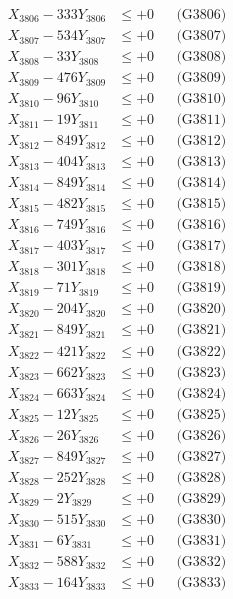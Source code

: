 \documentclass[a4paper,10pt]{article}
\begin{document}
{\begin{align}
X_{3806} - 333Y_{3806} &\leq +0 && \text{(G3806)} \\
X_{3807} - 534Y_{3807} &\leq +0 && \text{(G3807)} \\
X_{3808} - 33Y_{3808} &\leq +0 && \text{(G3808)} \\
X_{3809} - 476Y_{3809} &\leq +0 && \text{(G3809)} \\
X_{3810} - 96Y_{3810} &\leq +0 && \text{(G3810)} \\
\allowbreak
X_{3811} - 19Y_{3811} &\leq +0 && \text{(G3811)} \\
X_{3812} - 849Y_{3812} &\leq +0 && \text{(G3812)} \\
X_{3813} - 404Y_{3813} &\leq +0 && \text{(G3813)} \\
X_{3814} - 849Y_{3814} &\leq +0 && \text{(G3814)} \\
X_{3815} - 482Y_{3815} &\leq +0 && \text{(G3815)} \\
X_{3816} - 749Y_{3816} &\leq +0 && \text{(G3816)} \\
X_{3817} - 403Y_{3817} &\leq +0 && \text{(G3817)} \\
X_{3818} - 301Y_{3818} &\leq +0 && \text{(G3818)} \\
X_{3819} - 71Y_{3819} &\leq +0 && \text{(G3819)} \\
X_{3820} - 204Y_{3820} &\leq +0 && \text{(G3820)} \\
\allowbreak
X_{3821} - 849Y_{3821} &\leq +0 && \text{(G3821)} \\
X_{3822} - 421Y_{3822} &\leq +0 && \text{(G3822)} \\
X_{3823} - 662Y_{3823} &\leq +0 && \text{(G3823)} \\
X_{3824} - 663Y_{3824} &\leq +0 && \text{(G3824)} \\
X_{3825} - 12Y_{3825} &\leq +0 && \text{(G3825)} \\
X_{3826} - 26Y_{3826} &\leq +0 && \text{(G3826)} \\
X_{3827} - 849Y_{3827} &\leq +0 && \text{(G3827)} \\
X_{3828} - 252Y_{3828} &\leq +0 && \text{(G3828)} \\
X_{3829} - 2Y_{3829} &\leq +0 && \text{(G3829)} \\
X_{3830} - 515Y_{3830} &\leq +0 && \text{(G3830)} \\
\allowbreak
X_{3831} - 6Y_{3831} &\leq +0 && \text{(G3831)} \\
X_{3832} - 588Y_{3832} &\leq +0 && \text{(G3832)} \\
X_{3833} - 164Y_{3833} &\leq +0 && \text{(G3833)} \\

\end{align}}
\end{document}
